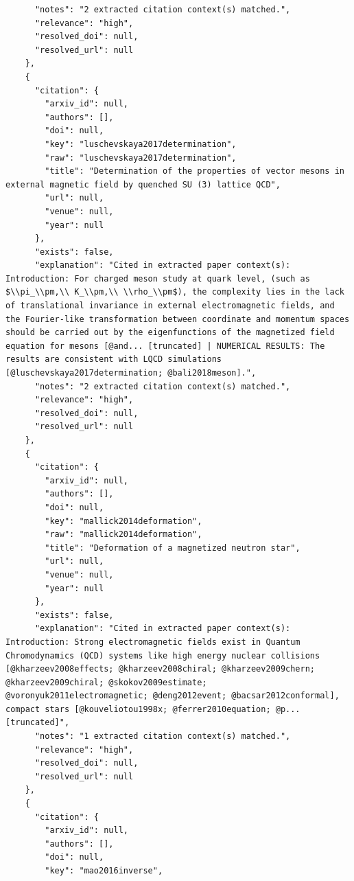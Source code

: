 \documentclass[11pt]{article}
\begin{document}
\begin{verbatim}
      "notes": "2 extracted citation context(s) matched.",
      "relevance": "high",
      "resolved_doi": null,
      "resolved_url": null
    },
    {
      "citation": {
        "arxiv_id": null,
        "authors": [],
        "doi": null,
        "key": "luschevskaya2017determination",
        "raw": "luschevskaya2017determination",
        "title": "Determination of the properties of vector mesons in external magnetic field by quenched SU (3) lattice QCD",
        "url": null,
        "venue": null,
        "year": null
      },
      "exists": false,
      "explanation": "Cited in extracted paper context(s): Introduction: For charged meson study at quark level, (such as $\\pi_\\pm,\\ K_\\pm,\\ \\rho_\\pm$), the complexity lies in the lack of translational invariance in external electromagnetic fields, and the Fourier-like transformation between coordinate and momentum spaces should be carried out by the eigenfunctions of the magnetized field equation for mesons [@and... [truncated] | NUMERICAL RESULTS: The results are consistent with LQCD simulations [@luschevskaya2017determination; @bali2018meson].",
      "notes": "2 extracted citation context(s) matched.",
      "relevance": "high",
      "resolved_doi": null,
      "resolved_url": null
    },
    {
      "citation": {
        "arxiv_id": null,
        "authors": [],
        "doi": null,
        "key": "mallick2014deformation",
        "raw": "mallick2014deformation",
        "title": "Deformation of a magnetized neutron star",
        "url": null,
        "venue": null,
        "year": null
      },
      "exists": false,
      "explanation": "Cited in extracted paper context(s): Introduction: Strong electromagnetic fields exist in Quantum Chromodynamics (QCD) systems like high energy nuclear collisions [@kharzeev2008effects; @kharzeev2008chiral; @kharzeev2009chern; @kharzeev2009chiral; @skokov2009estimate; @voronyuk2011electromagnetic; @deng2012event; @bacsar2012conformal], compact stars [@kouveliotou1998x; @ferrer2010equation; @p... [truncated]",
      "notes": "1 extracted citation context(s) matched.",
      "relevance": "high",
      "resolved_doi": null,
      "resolved_url": null
    },
    {
      "citation": {
        "arxiv_id": null,
        "authors": [],
        "doi": null,
        "key": "mao2016inverse",

\end{verbatim}
\end{document}
